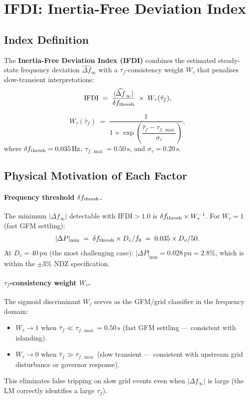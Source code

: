 \documentclass[11pt, a4paper]{article}
\newcommand{\dfhat}{\widehat{\Delta f}_\infty}
\newcommand{\taufhat}{\hat{\tau}_f}
\newcommand{\IFDI}{\mathrm{IFDI}}
\newcommand{\Wtau}{W_\tau}
\begin{document}
\section{IFDI: Inertia-Free Deviation Index}
\label{sec:ifdi}

\subsection{Index Definition}

The \textbf{Inertia-Free Deviation Index (IFDI)} combines the estimated
steady-state frequency deviation $\dfhat$ with a $\tau_f$-consistency weight
$\Wtau$ that penalises slow-transient interpretations:
\begin{equation}
  \IFDI \;=\; \frac{|\dfhat|}{\delta f_{\rm thresh}} \;\times\; \Wtau(\taufhat),
  \label{eq:ifdi}
\end{equation}

\begin{equation}
  \Wtau(\taufhat) \;=\; \frac{1}{1 + \exp\!\left(
    \dfrac{\taufhat - \tau_{f,\max}}{\sigma_\tau}\right)},
  \label{eq:wtau}
\end{equation}
where $\delta f_{\rm thresh} = 0.035\,\text{Hz}$,
$\tau_{f,\max} = 0.50\,\text{s}$, and $\sigma_\tau = 0.20\,\text{s}$.

\subsection{Physical Motivation of Each Factor}

\paragraph{Frequency threshold $\delta f_{\rm thresh}$.}
The minimum $|\Delta f_\infty|$ detectable with $\IFDI > 1.0$ is
$\delta f_{\rm thresh} \times \Wtau^{-1}$.  For $\Wtau = 1$ (fast GFM
settling):
\begin{equation}
  |\Delta P|_{\min} \;=\; \delta f_{\rm thresh} \times D_v / f_0
  \;=\; 0.035 \times D_v / 50.
\end{equation}
At $D_v = 40\,\text{pu}$ (the most challenging case): $|\Delta P|_{\min} =
0.028\,\text{pu} = 2.8\%$, which is within the
$\pm 3\%$ NDZ specification.

\paragraph{$\tau_f$-consistency weight $\Wtau$.}
The sigmoid discriminant $\Wtau$ serves as the GFM/grid classifier in the
frequency domain:
\begin{itemize}
  \item $\Wtau \to 1$ when $\taufhat \ll \tau_{f,\max} = 0.50\,\text{s}$
    (fast GFM settling — consistent with islanding).
  \item $\Wtau \to 0$ when $\taufhat \gg \tau_{f,\max}$ (slow transient —
    consistent with upstream grid disturbance or governor response).
\end{itemize}
This eliminates false tripping on slow grid events even when
$|\Delta f_\infty|$ is large (the LM correctly identifies a large $\tau_f$).
\end{document}
